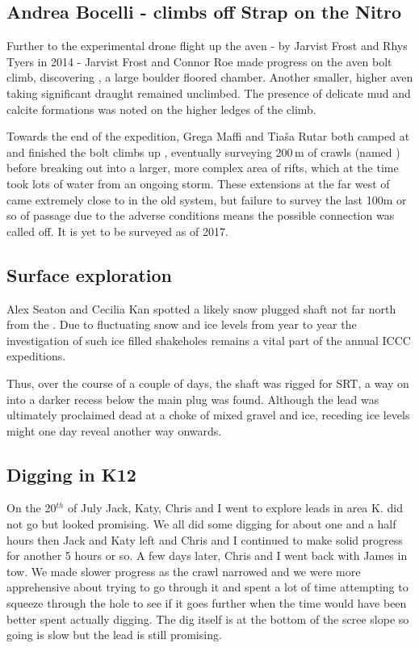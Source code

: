 \subsection{Andrea Bocelli - climbs off Strap on the Nitro}
Further to the experimental drone flight up the  aven - by Jarvist Frost and Rhys Tyers in 2014 - Jarvist Frost and Connor Roe made progress on the aven bolt climb, discovering , a large boulder floored chamber. Another smaller, higher aven taking significant draught remained unclimbed. The presence of delicate mud and calcite formations was noted on the higher ledges of the climb.

Towards the end of the expedition, Grega Maffi and Tia\v{s}a Rutar both camped at 
 and finished the bolt climbs up , eventually surveying 200\,m of crawls (named ) before breaking out into a larger, more complex area of rifts, which at the time took lots of water from an ongoing storm. These extensions at the far west of  came extremely close to  in the old system, but failure to survey the last 100m or so of passage due to the adverse conditions means the possible connection was called off. It is yet to be surveyed as of 2017.

\subsection{Surface exploration}
Alex Seaton and Cecilia Kan spotted a likely snow plugged shaft not far north from the . Due to fluctuating snow and ice levels from year to year the investigation of such ice filled shakeholes remains a vital part of the annual ICCC expeditions. 

Thus, over the course of a couple of days, the shaft was rigged for SRT, a way on into a darker recess below the main plug was found. Although the lead was ultimately proclaimed dead at a choke of mixed gravel and ice, receding ice levels might one day reveal another way onwards. 

\subsection{Digging in K12}

On the 20$^{th}$ of July Jack, Katy, Chris and I went to explore leads in area K.  did not go but  looked promising.  We all did some digging for about one and a half hours then Jack and Katy left and Chris and I continued to make solid progress for another 5 hours or so. A few days later, Chris and I went back with James in tow. We made slower progress as the crawl narrowed and we were more apprehensive about trying to go through it and spent a lot of time attempting to squeeze through the hole to see if it goes further when the time would have been better spent actually digging. The dig itself is at the bottom of the scree slope so going is slow but the lead is still promising. 

